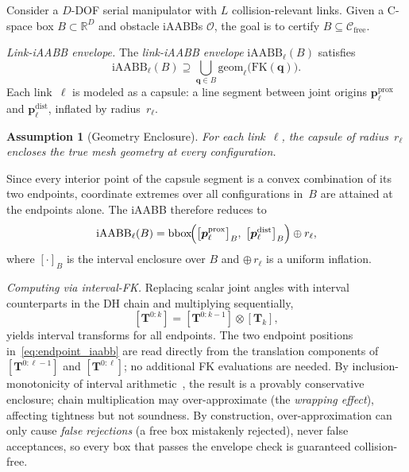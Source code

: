 \documentclass[journal]{IEEEtran}
\newtheorem{assumption}{Assumption}
\newcommand{\Cfree}{\mathcal{C}_\text{free}}
\newcommand{\iAABB}{\text{iAABB}}
\newcommand{\FK}{\text{FK}}
\newcommand{\Real}{\mathbb{R}}
\newcommand{\calO}{\mathcal{O}}
\newcommand{\bT}{\mathbf{T}}
\begin{document}
Consider a $D$-DOF serial manipulator with $L$ collision-relevant links.
Given a C-space box $B \subset \Real^D$ and obstacle iAABBs $\calO$,
the goal is to certify $B \subseteq \Cfree$.

\emph{Link-iAABB envelope.}
The \emph{link-iAABB envelope} $\iAABB_\ell(B)$ satisfies
\begin{equation}\label{eq:envelope}
  \iAABB_\ell(B) \supseteq \bigcup_{\bm{q} \in B}
    \mathrm{geom}_\ell\bigl(\FK(\bm{q})\bigr).
\end{equation}
Each link~$\ell$ is modeled as a capsule: a line segment between joint
origins $\bm{p}_\ell^{\mathrm{prox}}$ and $\bm{p}_\ell^{\mathrm{dist}}$,
inflated by radius~$r_\ell$.

\begin{assumption}[Geometry Enclosure]\label{asm:geom}
For each link~$\ell$, the capsule of radius~$r_\ell$ encloses the
true mesh geometry at every configuration.
\end{assumption}

Since every interior point of the capsule segment is a convex combination
of its two endpoints, coordinate extremes over all configurations in~$B$
are attained at the endpoints alone.
The iAABB therefore reduces to
\begin{equation}\label{eq:endpoint_iaabb}
  \iAABB_\ell(B)
  = \mathrm{bbox}\!\Bigl(
      \bigl[\bm{p}_\ell^{\mathrm{prox}}\bigr]_B,\;
      \bigl[\bm{p}_\ell^{\mathrm{dist}}\bigr]_B
    \Bigr) \oplus r_\ell,
\end{equation}
where $[\cdot]_B$ is the interval enclosure over $B$ and $\oplus\,r_\ell$
is a uniform inflation.

\emph{Computing via interval-FK.}
Replacing scalar joint angles with interval counterparts in the DH chain
and multiplying sequentially,
\begin{equation}\label{eq:chain}
  [\bT^{0:k}] = [\bT^{0:k-1}] \otimes [\bT_k],
\end{equation}
yields interval transforms for all endpoints.
The two endpoint positions in~\eqref{eq:endpoint_iaabb} are read directly
from the translation components of $[\bT^{0:\ell-1}]$ and $[\bT^{0:\ell}]$;
no additional FK evaluations are needed.
By inclusion-monotonicity of interval
arithmetic~\cite{moore2009introduction}, the result is a
provably conservative enclosure; chain multiplication may over-approximate
(the \emph{wrapping effect}), affecting tightness but not soundness.
By construction, over-approximation can only cause \emph{false rejections}
(a free box mistakenly rejected), never false acceptances, so every
box that passes the envelope check is guaranteed collision-free.
\end{document}
